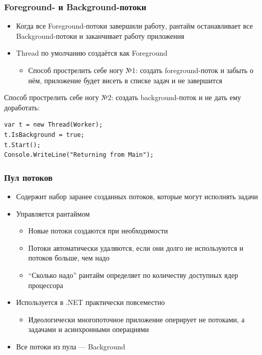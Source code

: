 \documentclass{../../slides-style}
\begin{document}
    \begin{frame}[fragile]
        \frametitle{Foreground- и Background-потоки}
        \begin{itemize}
            \item Когда все Foreground-потоки завершили работу, рантайм останавливает все Background-потоки и заканчивает работу приложения
            \item Thread по умолчанию создаётся как Foreground
            \begin{itemize}
                \item Способ прострелить себе ногу №1: создать foreground-поток и забыть о нём, приложение будет висеть в списке задач и не завершится
            \end{itemize}
        \end{itemize}
        \vspace{5mm}
        Способ прострелить себе ногу №2: создать background-поток и не дать ему доработать:
        \begin{verbatim}
var t = new Thread(Worker);
t.IsBackground = true;
t.Start();
Console.WriteLine("Returning from Main");
        \end{verbatim}
    \end{frame}

    \begin{frame}
        \frametitle{Пул потоков}
        \begin{itemize}
            \item Содержит набор заранее созданных потоков, которые могут исполнять задачи
            \item Управляется рантаймом
            \begin{itemize}
                \item Новые потоки создаются при необходимости
                \item Потоки автоматически удаляются, если они долго не используются и потоков больше, чем надо
                \item ``Сколько надо'' рантайм определяет по количеству доступных ядер процессора
            \end{itemize}
            \item Используется в .NET практически повсеместно
            \begin{itemize}
                \item Идеологически многопоточное приложение оперирует не потоками, а задачами и асинхронными операциями
            \end{itemize}
            \item Все потоки из пула --- Background
        \end{itemize}
    \end{frame}
\end{document}
